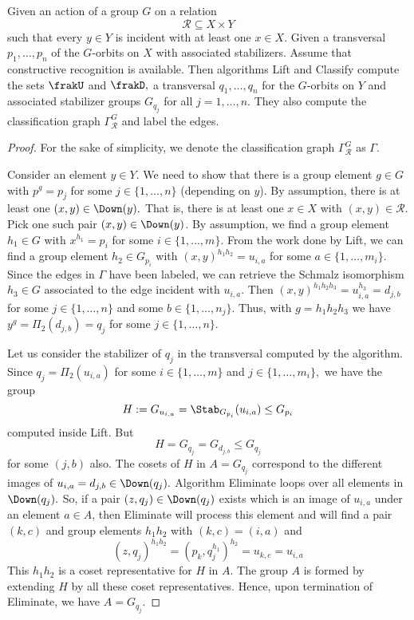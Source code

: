 \begin{theorem}
Given an action of a group $G$ on a relation 
$$
{\mathcal R} \subseteq  X\times Y
$$
such that every $y \in Y$ is incident with at least one $x \in X.$ 
Given a transversal $p_1,\ldots,p_n$ of the $G$-orbits on $X$ with associated stabilizers. 
Assume that constructive recognition is available.
Then algorithms {\sc Lift} and {\sc Classify} 
compute the sets $\frakU$ and $\frakD,$
a transversal $q_1,\ldots,q_n$  for the $G$-orbits on $Y$ and
associated stabilizer groups $G_{q_j}$ for all $j=1,\ldots,n.$ 
They also compute the classification graph $\Gamma_{\mathcal R}^G$ and label the edges.
\end{theorem}
\begin{proof}
For the sake of simplicity, we denote the classification graph $\Gamma_{\mathcal R}^G$ 
as $\Gamma.$

\smallskip


Consider an element $y \in Y.$ 
We need to show that there is a group element $g \in G$ 
with $p^g = p_j$ for some $j \in \{ 1,\ldots,n\}$ (depending on $y$).
By assumption, there is at least one $(x,y) \in \Down(y).$ That is, 
there is at least one $x \in X$ with $(x,y) \in {\mathcal R}.$
Pick one such pair $(x,y) \in \Down(y)$.
By assumption, we find a group element $h_1 \in G$ 
with $x^{h_1} = p_i$ for some $i \in \{ 1,\ldots,m\}.$ 
From the work done by {\sc Lift}, we can find a group element $h_2 \in G_{p_i}$ with
$(x,y)^{h_1h_2} = u_{i,a}$ for some $a \in \{ 1,\ldots,m_i\}.$ 
Since the edges in $\Gamma$ have been labeled, 
we can retrieve the Schmalz isomorphism $h_3 \in G$ 
associated to the edge incident with $u_{i,a}$. 
Then $(x,y)^{h_1h_2h_3} = u_{i,a}^{h_3}=d_{j,b}$ for some $j \in \{ 1,\ldots,n\}$ 
and some $b \in \{1,\ldots,n_j\}.$ 
Thus, with $g = h_1h_2h_3$ we have $y^g = \Pi_2(d_{j,b}) = q_j$ for some $j \in \{ 1,\ldots,n\}.$

\smallskip

Let us consider the stabilizer of $q_j$ in the transversal computed by the algorithm.
Since $q_j = \Pi_2(u_{i,a})$ for some $i \in \{1,\ldots,m\}$ and $j \in \{ 1,\ldots,m_i\},$ 
we have the group 
$$
H := G_{u_{i,a}} = \Stab_{G_{p_i}}(u_{i,a}) \le G_{p_i}  
$$
computed inside  {\sc Lift}. 
But
$$
H = G_{q_j} = G_{d_{j,b}} \le  G_{q_j} 
$$ 
for some $(j,b)$ also. 
The cosets of $H$ in $A = G_{q_j}$ correspond to the different images of 
$u_{i,a} = d_{j,b} \in \Down(q_j).$ 
Algorithm {\sc Eliminate} loops over all elements in $\Down(q_j).$ 
So, if a pair $(z,q_j) \in \Down(q_j)$ exists which is an image of $u_{i,a}$ 
under an element $a\in A$, then {\sc Eliminate} will process 
this element and will find a pair $(k,c)$ and group elements $h_1h_2$ 
with $(k,c) = (i,a)$ and  
$$
(z,q_j)^{h_1h_2}= (p_k,q_j^{h_1})^{h_2} = u_{k,c} = u_{i,a}
$$
This $h_1h_2$ is a coset representative for $H$ in $A$. 
The group $A$ is formed by extending $H$ by all these coset representatives. 
Hence, upon termination of {\sc Eliminate}, we have $A = G_{q_j}.$ 



\end{proof}
